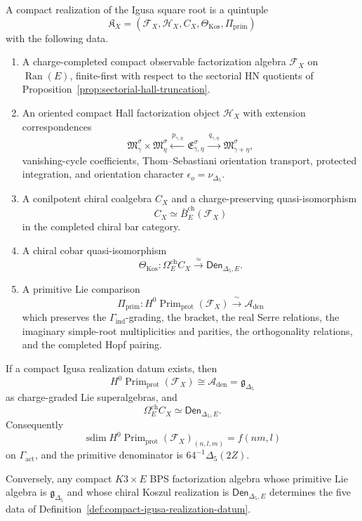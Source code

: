 \documentclass[11pt]{memoir}
\newcommand{\sdim}{\operatorname{sdim}}
\newcommand{\Prim}{\operatorname{Prim}}
\begin{document}
\begin{definition}
\label{def:compact-igusa-realization-datum}
A compact realization of the Igusa square root is a quintuple
$$
\mathfrak K_X
=\left(\mathcal F_X,\mathcal H_X,C_X,\Theta_{\mathrm{Kos}},
\Pi_{\mathrm{prim}}\right)
$$
with the following data.
\begin{enumerate}
\item A charge-completed compact observable factorization algebra
\(\mathcal F_X\) on \(\operatorname{Ran}(E)\), finite-first with respect to the
sectorial HN quotients of Proposition~\ref{prop:sectorial-hall-truncation}.
\item An oriented compact Hall factorization object \(\mathcal H_X\)
with extension correspondences
$$
\mathfrak M_\gamma^\sigma\times\mathfrak M_\eta^\sigma
\xleftarrow{\ p_{\gamma,\eta}\ }
\mathfrak E_{\gamma,\eta}^\sigma
\xrightarrow{\ q_{\gamma,\eta}\ }
\mathfrak M_{\gamma+\eta}^\sigma,
$$
vanishing-cycle coefficients, Thom--Sebastiani orientation transport,
protected integration, and orientation character \(\epsilon_o=\nu_{\Delta_5}\).
\item A conilpotent chiral coalgebra \(C_X\) and a charge-preserving
quasi-isomorphism
$$
C_X\simeq \bar B_E^{\mathrm{ch}}(\mathcal F_X)
$$
in the completed chiral bar category.
\item A chiral cobar quasi-isomorphism
$$
\Theta_{\mathrm{Kos}}:
\Omega_E^{\mathrm{ch}}C_X
\xrightarrow{\ \simeq\ }
\mathsf{Den}_{\Delta_5,E}.
$$
\item A primitive Lie comparison
$$
\Pi_{\mathrm{prim}}:
H^0\Prim_{\mathrm{prot}}(\mathcal F_X)
\xrightarrow{\ \sim\ }
\mathcal A_{\mathrm{den}}
$$
which preserves the \(\Gamma_{\mathrm{ind}}\)-grading, the bracket, the
real Serre relations, the imaginary simple-root multiplicities and
parities, the orthogonality relations, and the completed Hopf pairing.
\end{enumerate}
\end{definition}

\begin{theorem}
\label{thm:microscopic-hall-drinfeld-criterion}
If a compact Igusa realization datum exists, then
$$
H^0\Prim_{\mathrm{prot}}(\mathcal F_X)
\cong
\mathcal A_{\mathrm{den}}
=\mathfrak g_{\Delta_5}
$$
as charge-graded Lie superalgebras, and
$$
\Omega_E^{\mathrm{ch}}C_X\simeq\mathsf{Den}_{\Delta_5,E}.
$$
Consequently
$$
\sdim H^0\Prim_{\mathrm{prot}}(\mathcal F_X)_{(n,l,m)}
=f(nm,l)
$$
on \(\Gamma_{\mathrm{act}}\), and the primitive denominator is
\(64^{-1}\Delta_5(2Z)\).

Conversely, any compact \(K3\times E\) BPS factorization algebra whose
primitive Lie algebra is \(\mathfrak g_{\Delta_5}\) and whose chiral
Koszul realization is \(\mathsf{Den}_{\Delta_5,E}\) determines the five
data of Definition~\ref{def:compact-igusa-realization-datum}.
\end{theorem}
\end{document}
